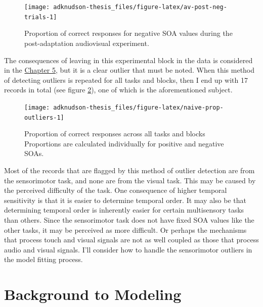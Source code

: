 \documentclass[
]{report}
\begin{document}
\begin{figure}

{\centering \texttt{[image: adknudson-thesis\_files/figure-latex/av-post-neg-trials-1]} 

}

\caption{Proportion of correct responses for negative SOA values during the post-adaptation audiovisual experiment.}\label{fig:av-post-neg-trials}
\end{figure}

The consequences of leaving in this experimental block in the data is considered in the \protect\hyperlink{workflow}{Chapter 5}, but it is a clear outlier that must be noted. When this method of detecting outliers is repeated for all tasks and blocks, then I end up with 17 records in total (see figure \ref{fig:naive-prop-outliers}), one of which is the aforementioned subject.

\begin{figure}

{\centering \texttt{[image: adknudson-thesis\_files/figure-latex/naive-prop-outliers-1]} 

}

\caption{Proportion of correct responses across all tasks and blocks Proportions are calculated individually for positive and negative SOAs.}\label{fig:naive-prop-outliers}
\end{figure}

Most of the records that are flagged by this method of outlier detection are from the sensorimotor task, and none are from the visual task. This may be caused by the perceived difficulty of the task. One consequence of higher temporal sensitivity is that it is easier to determine temporal order. It may also be that determining temporal order is inherently easier for certain multisensory tasks than others. Since the sensorimotor task does not have fixed SOA values like the other tasks, it may be perceived as more difficult. Or perhaps the mechanisms that process touch and visual signals are not as well coupled as those that process audio and visual signals. I'll consider how to handle the sensorimotor outliers in the model fitting process.

\hypertarget{background}{%
\chapter{Background to Modeling}\label{background}}
\end{document}

